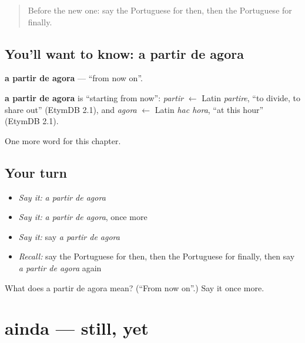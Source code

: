 \label{lesson:PT-C150-partir-de-agora}



\begin{quote}
Before the new one: say the Portuguese for then, then the Portuguese for finally.
\end{quote}

\subsection*{You'll want to know: a partir de agora}
\textbf{a partir de agora} — \textquotedblleft{}from now on\textquotedblright{}.

\begin{cousinweb}
\textbf{a partir de agora} is \textquotedblleft{}starting from now\textquotedblright{}: \emph{partir} $\leftarrow$ Latin \emph{partire}, \textquotedblleft{}to divide, to share out\textquotedblright{} (EtymDB 2.1), and \emph{agora} $\leftarrow$ Latin \emph{hac hora}, \textquotedblleft{}at this hour\textquotedblright{} (EtymDB 2.1).
\end{cousinweb}

\begin{grammarlens}[title={What you've built}]
One more word for this chapter.
\end{grammarlens}

\subsection*{Your turn}
\begin{itemize}
\raggedright
  \item \emph{Say it:} \emph{a partir de agora}
  \item \emph{Say it:} \emph{a partir de agora}, once more
  \item \emph{Say it:} say \emph{a partir de agora}
  \item \emph{Recall:} say the Portuguese for then, then the Portuguese for finally, then say \emph{a partir de agora} again
\end{itemize}

\begin{tcolorbox}[breakable,colback=teal!4,colframe=teal!35!black,title={Before you move on}]
What does a partir de agora mean? (\textquotedblleft{}From now on\textquotedblright{}.) Say it once more.
\end{tcolorbox}
\section[ainda]{ainda — still, yet}

